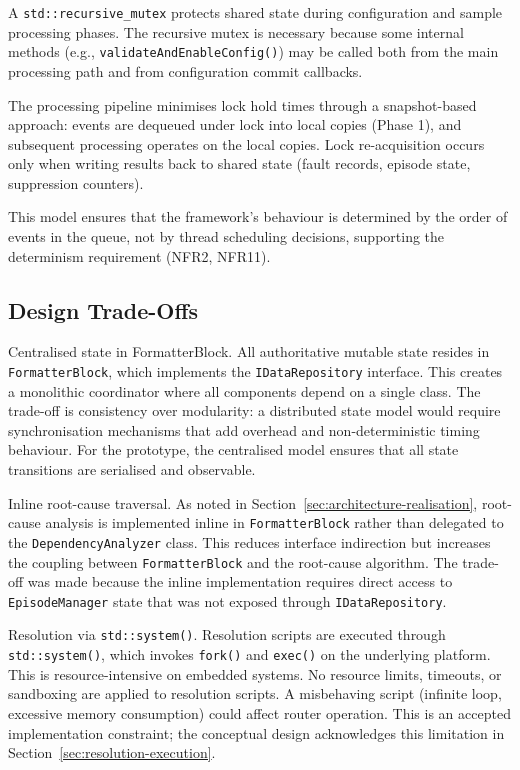 A \texttt{std::recursive\_mutex} protects shared state during configuration and sample processing phases. The recursive mutex is necessary because some internal methods (e.g., \texttt{validateAndEnableConfig()}) may be called both from the main processing path and from configuration commit callbacks.

The processing pipeline minimises lock hold times through a snapshot-based approach: events are dequeued under lock into local copies (Phase 1), and subsequent processing operates on the local copies. Lock re-acquisition occurs only when writing results back to shared state (fault records, episode state, suppression counters).

This model ensures that the framework's behaviour is determined by the order of events in the queue, not by thread scheduling decisions, supporting the determinism requirement (NFR2, NFR11).

\subsection{Design Trade-Offs}

Centralised state in FormatterBlock. All authoritative mutable state resides in \texttt{FormatterBlock}, which implements the \texttt{IDataRepository} interface. This creates a monolithic coordinator where all components depend on a single class. The trade-off is consistency over modularity: a distributed state model would require synchronisation mechanisms that add overhead and non-deterministic timing behaviour. For the prototype, the centralised model ensures that all state transitions are serialised and observable.

Inline root-cause traversal. As noted in Section~\ref{sec:architecture-realisation}, root-cause analysis is implemented inline in \texttt{FormatterBlock} rather than delegated to the \texttt{DependencyAnalyzer} class. This reduces interface indirection but increases the coupling between \texttt{FormatterBlock} and the root-cause algorithm. The trade-off was made because the inline implementation requires direct access to \texttt{EpisodeManager} state that was not exposed through \texttt{IDataRepository}.

Resolution via \texttt{std::system()}. Resolution scripts are executed through \texttt{std::system()}, which invokes \texttt{fork()} and \texttt{exec()} on the underlying platform. This is resource-intensive on embedded systems. No resource limits, timeouts, or sandboxing are applied to resolution scripts. A misbehaving script (infinite loop, excessive memory consumption) could affect router operation. This is an accepted implementation constraint; the conceptual design acknowledges this limitation in Section~\ref{sec:resolution-execution}.

